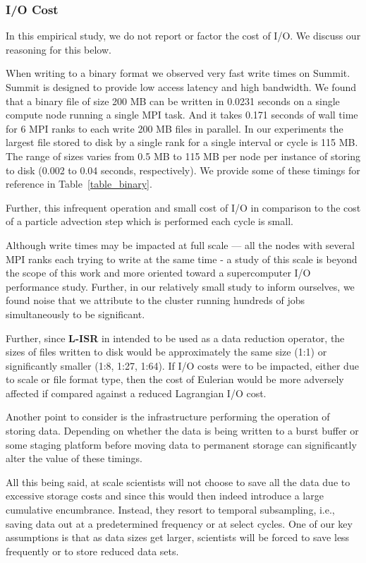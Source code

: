 \subsubsection{I/O Cost}
In this empirical study, we do not report or factor the cost of I/O. 
%
We discuss our reasoning for this below. 

When writing to a binary format we observed very fast write times on Summit. 
%
Summit is designed to provide low access latency and high bandwidth. 
%
We found that a binary file of size 200 MB can be written in 0.0231 seconds on a single compute node running a single MPI task. 
%
And it takes 0.171 seconds of wall time for 6 MPI ranks to each write 200 MB files in parallel. 
%
In our experiments the largest file stored to disk by a single rank for a single interval or cycle is 115 MB. 
%
The range of sizes varies from 0.5 MB to 115 MB per node per instance of storing to disk (0.002 to 0.04 seconds, respectively). 
%
We provide some of these timings for reference in Table~\ref{table_binary}.

%
Further, this infrequent operation and small cost of I/O in comparison 
to the cost of a particle advection step which is performed each cycle is small.

Although write times may be impacted at full scale --- all the nodes with several MPI ranks each trying to write at the same time - a study of this scale is beyond the scope of this work and more oriented toward a supercomputer I/O performance study. 
%
Further, in our relatively small study to inform ourselves, we found noise that we attribute to the cluster running hundreds of jobs simultaneously to be significant. 

Further, since \textbf{L-ISR} in intended to be used as a data reduction operator, the sizes of files written to disk would be approximately the same size (1:1) or significantly smaller (1:8, 1:27, 1:64). 
%
If I/O costs were to be impacted, either due to scale or file format type, then the cost of Eulerian would be more adversely affected if compared against a reduced Lagrangian I/O cost. 
%

Another point to consider is the infrastructure performing the operation of storing data. 
%
Depending on whether the data is being written to a burst buffer or some staging platform before moving data to permanent storage can significantly alter the value of these timings. 

All this being said, at scale scientists will not choose to save all the data due to excessive storage costs and since this would then indeed introduce a large cumulative encumbrance. 
%
Instead, they resort to temporal subsampling, i.e., saving data out at a predetermined frequency or at select cycles. 
%
One of our key assumptions is that as data sizes get larger, scientists will be forced to save less frequently or to store reduced data sets. 

